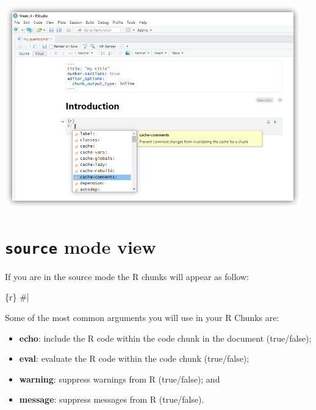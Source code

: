 \documentclass[
  letterpaper,
  DIV=11,
  numbers=noendperiod]{scrartcl}
\newenvironment{Shaded}{\begin{snugshade}}{\end{snugshade}}
\newcommand{\InformationTok}[1]{\textcolor[rgb]{0.37,0.37,0.37}{#1}}
\providecommand{\tightlist}{%
  \setlength{\itemsep}{0pt}\setlength{\parskip}{0pt}}\usepackage{longtable,booktabs,array}
\begin{document}
\begin{center}
\includegraphics[width=5.05208in,height=\textheight]{images/quarto6.png}
\end{center}

\section{\texorpdfstring{\texttt{source} mode view}{source mode view}}

If you are in the source mode the R chunks will appear as follow:

\begin{Shaded}
\begin{Highlighting}[]
\InformationTok{\textasciigrave{}\textasciigrave{}\textasciigrave{}\{r\}}
\InformationTok{\#| }

\InformationTok{\textasciigrave{}\textasciigrave{}\textasciigrave{}}
\end{Highlighting}
\end{Shaded}

Some of the most common arguments you will use in your R Chunks are:

\begin{itemize}
\tightlist
\item
  \textbf{echo}: include the R code within the code chunk in the
  document (true/false);
\item
  \textbf{eval}: evaluate the R code within the code chunk (true/false);
\item
  \textbf{warning}: suppress warnings from R (true/false); and
\item
  \textbf{message}: suppress messages from R (true/false).
\end{itemize}
\end{document}
